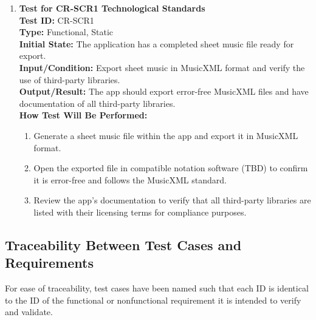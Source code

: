 \documentclass[12pt, titlepage]{article}
\begin{document}
\begin{enumerate}
    \item \textbf{Test for CR-SCR1 Technological Standards} \\
      \newline
      \textbf{Test ID:} CR-SCR1 \\
      \textbf{Type:} Functional, Static \\
      \textbf{Initial State:} The application has a completed sheet music file ready for export. \\
      \textbf{Input/Condition:} Export sheet music in MusicXML format and verify the use of third-party libraries. \\
      \textbf{Output/Result:} The app should export error-free MusicXML files and have documentation of all third-party libraries. \\
      \textbf{How Test Will Be Performed:}
      \begin{enumerate}
          \item Generate a sheet music file within the app and export it in MusicXML format.
          \item Open the exported file in compatible notation software (TBD) to confirm it is error-free and follows the 
          MusicXML standard.
          \item Review the app’s documentation to verify that all third-party libraries are listed with their licensing 
          terms for compliance purposes.
      \end{enumerate}
\end{enumerate}

\subsection{Traceability Between Test Cases and Requirements}

For ease of traceability, test cases have been named such that each ID is identical to the ID of 
the functional or nonfunctional requirement it is intended to verify and validate. 
  
\end{document}
